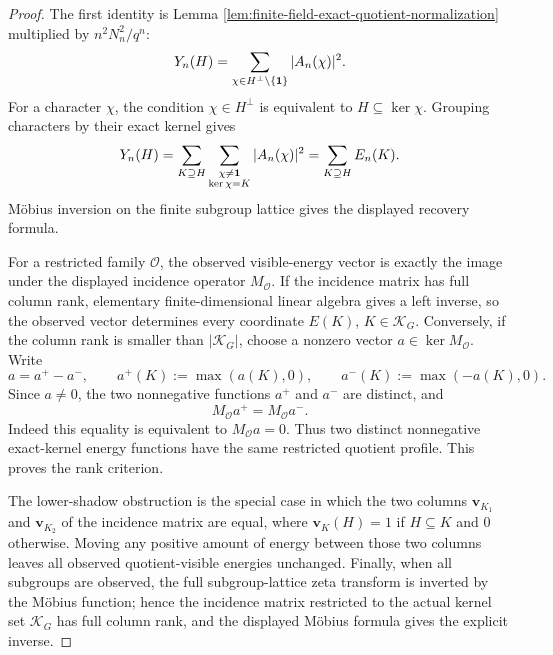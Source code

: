 \begin{proof}
The first identity is Lemma \ref{lem:finite-field-exact-quotient-normalization}
multiplied by \(n^2N_n^2/q^n\):
\[
Y_n(H)=
\sum_{\chi\in H^\perp\setminus\{\mathbf{1}\}}|A_n(\chi)|^2.
\]
For a character \(\chi\), the condition \(\chi\in H^\perp\) is equivalent to
\(H\subseteq\ker\chi\).  Grouping characters by their exact kernel gives
\[
Y_n(H)=
\sum_{K\supseteq H}
\sum_{\substack{\chi\ne\mathbf{1}\\ \ker\chi=K}}|A_n(\chi)|^2
=\sum_{K\supseteq H}E_n(K).
\]
M\"obius inversion on the finite subgroup lattice gives the displayed recovery
formula.

For a restricted family \(\mathcal O\), the observed visible-energy vector is
exactly the image under the displayed incidence operator \(M_{\mathcal O}\).
If the incidence matrix has full column rank, elementary finite-dimensional
linear algebra gives a left inverse, so the observed vector determines every
coordinate \(E(K)\), \(K\in\mathcal K_G\).  Conversely, if the column rank is
smaller than \(|\mathcal K_G|\), choose a nonzero vector
\(a\in\ker M_{\mathcal O}\).  Write
\[
a=a^+-a^-,
\qquad
a^+(K):=\max(a(K),0),
\qquad
a^-(K):=\max(-a(K),0).
\]
Since \(a\ne0\), the two nonnegative functions \(a^+\) and \(a^-\) are
distinct, and
\[
M_{\mathcal O}a^+=M_{\mathcal O}a^-.
\]
Indeed this equality is equivalent to \(M_{\mathcal O}a=0\).  Thus two distinct
nonnegative exact-kernel energy functions have the same restricted quotient
profile.  This proves the rank criterion.

The lower-shadow obstruction is the special case in which the two columns
\(\mathbf v_{K_1}\) and \(\mathbf v_{K_2}\) of the incidence matrix are equal,
where \(\mathbf v_K(H)=1\) if \(H\subseteq K\) and \(0\) otherwise.  Moving any
positive amount of energy between those two columns leaves all observed
quotient-visible energies unchanged.  Finally, when all subgroups are observed,
the full subgroup-lattice zeta transform is inverted by the M\"obius function;
hence the incidence matrix restricted to the actual kernel set \(\mathcal K_G\)
has full column rank, and the displayed M\"obius formula gives the explicit
inverse.
\end{proof}

